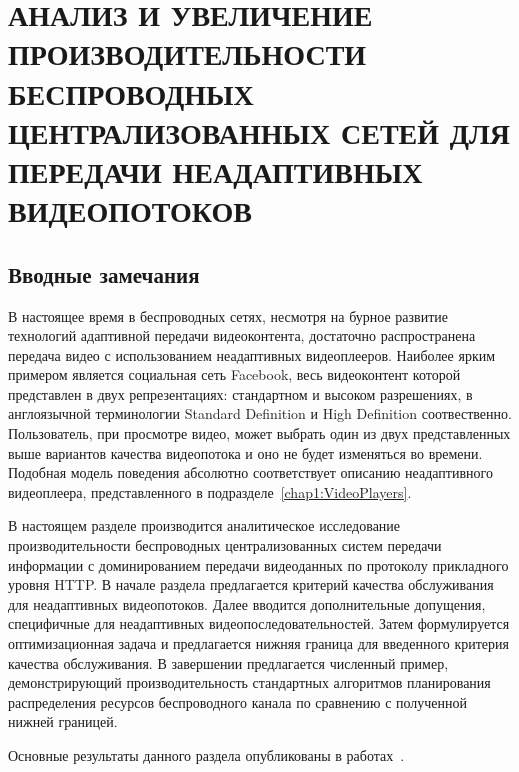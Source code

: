 \chapter{АНАЛИЗ И УВЕЛИЧЕНИЕ ПРОИЗВОДИТЕЛЬНОСТИ БЕСПРОВОДНЫХ ЦЕНТРАЛИЗОВАННЫХ СЕТЕЙ ДЛЯ ПЕРЕДАЧИ НЕАДАПТИВНЫХ ВИДЕОПОТОКОВ}
\label{chap3}

\section{Вводные замечания}
\label{chap3:Intro}
В настоящее время в беспроводных сетях, несмотря на бурное развитие технологий адаптивной передачи видеоконтента, достаточно распространена передача видео с использованием неадаптивных видеоплееров. Наиболее ярким примером является социальная сеть Facebook, весь видеоконтент которой представлен в двух репрезентациях: стандартном и высоком разрешениях, в англоязычной терминологии Standard Definition и High Definition соотвественно. Пользователь, при просмотре видео, может выбрать один из двух представленных выше вариантов качества видеопотока и оно не будет изменяться во времени. Подобная модель поведения абсолютно соответствует описанию неадаптивного видеоплеера, представленного в подразделе~\ref{chap1:VideoPlayers}.

В настоящем разделе производится аналитическое исследование производительности беспроводных централизованных систем передачи информации с доминированием передачи видеоданных по протоколу прикладного уровня HTTP. В начале раздела предлагается критерий качества обслуживания для неадаптивных видеопотоков. Далее вводится дополнительные допущения, специфичные для неадаптивных видеопоследовательностей. Затем формулируется оптимизационная задача и предлагается нижняя граница для введенного критерия качества обслуживания. В завершении предлагается численный пример, демонстрирующий производительность стандартных алгоритмов планирования распределения ресурсов беспроводного канала по сравнению с полученной нижней границей.

Основные результаты данного раздела опубликованы в работах~\cite{past_tur,Suai2017}.

